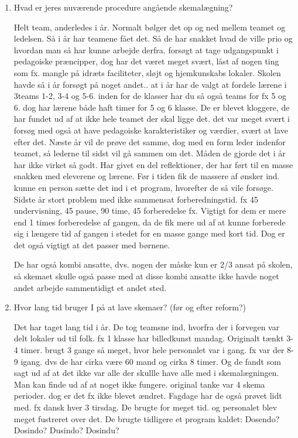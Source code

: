 \begin{enumerate}
	\item Hvad er jeres nuværende procedure angående skemalægning?

	Helt team, anderledes i år. Normalt bølger det op og ned mellem teamet  og ledelsen. Så i år har teamene fået det. Så de har snakket hvad de ville prio og hvordan man så har kunne arbejde derfra. forsøgt at tage udgangspunkt i pedagoiske præncipper, dog har det været meget svært, låst af nogen ting som fx. mangle på idræts faciliteter, sløjt og hjemkunskabs lokaler. Skolen havde så i år forsøgt på noget andet.. at i år har de valgt at fordele lærene i 3teams  1-2, 3-4 og 5-6. inden for de klasser har du så også teams for fx 5 og 6. dog har lærene både haft timer for 5 og 6 klasse. De er blevet kloggere, de har fundet ud af at ikke hele teamet der skal ligge det. det var meget svært i forsøg med også at have pedagoiske karakteristiker og værdier, svært at lave efter det. Næste år vil de prøve det samme, dog med en form leder indenfor teamet, så lederne til sidst vil gå sammen om det. Måden de gjorde det i år har ikke virket så godt. Har givet en del reflektioner, der har ført til en masse snakken med eleverene og lærene. Før i tiden fik de massere af ønsker ind. kunne en person sætte det ind i et program, hvorefter de så vile forsøge. Sidste år stort problem med ikke sammensat forberedningstid. fx 45 undervisning, 45 pause, 90 time, 45 forberedelse fx. Vigtigt for dem er mere end 1 times forberedelse af gangen, da de fik mere ud af at kunne forberede sig i længere tid af gangen i stedet for en masse gange med kort tid. Dog er det også vigtigt at det passer med børnene. 

De har også kombi ansatte, dvs. nogen der måske kun er 2/3 ansat på skolen, så skemaet skulle også passe med at disse kombi ansatte ikke havde noget andet arbejde sammentidigt et andet sted.
	
	\item Hvor lang tid bruger I på at lave skemaer? (før og efter reform?)
	
	Det har taget lang tid i år. De tog teamsne ind, hvorfra der i forvegen var delt lokaler ud til folk. fx 1 klasse har billedkunst mandag. Originalt tænkt 3-4 timer. brugt 3 gange så meget, hvor hele personalet var i gang. fx var der 8-9 igang. dvs de har cirka være 60 mand og cirka 8 timer. Og de fandt som sagt ud af at det ikke var alle der skullle have alle med i skemalægningen. Man kan finde ud af at noget ikke fungere. original tanke var 4 skema perioder. dog er det fx ikke blevet ændret. Fagdage har de også prøvet lidt med. fx dansk hver 3 tirsdag. De brugte for meget tid. og personalet blev meget fustreret over det. De brugte tidligere et program kaldet: Dosendo? Dosindo? Dusindo? Dosindu? 


\end{enumerate}
